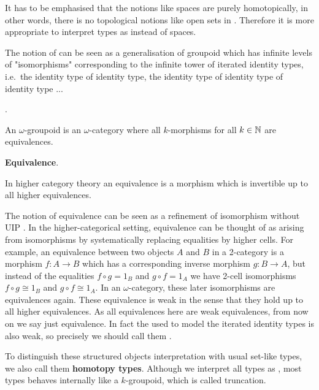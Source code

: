 \begin{remark}
It has to be emphasised that the notions like spaces are purely homotopically, in other words, there is no topological notions like open sets in \hott. Therefore it is more appropriate to interpret types as \og instead of spaces. 

The notion of \og can be seen as a generalisation of groupoid which has infinite levels of "isomorphisms" corresponding to the infinite tower of iterated identity types, i.e.\ the identity type of identity type, the identity type of identity type of identity type ... 


\begin{definition}
\textbf{\ogs}.

An $\omega$-groupoid is an $\omega$-category where all $k$-morphisms for all $k \in \mathbb{N}$ are equivalences. 
\end{definition}

\begin{definition}
\textbf{Equivalence}.

In higher category theory an equivalence is a morphism which is invertible up to all higher equivalences.
\end{definition}


The notion of equivalence can be seen as a refinement of isomorphism without UIP \cite{txa:csl}. 
In the higher-categorical setting, equivalence can be thought of as arising from isomorphisms by systematically replacing equalities by higher cells.
For example, an equivalence 
between two objects $A$ and $B$ in a 2-category is a morphism $f : A \rightarrow B$ which has a
corresponding inverse morphism $ g : B \rightarrow A$, but instead of the
equalities $f ∘ g = 1_B$ and $g ∘ f = 1_A$ we have 2-cell isomorphisms $f ∘ g ≅ 1_B$ and $g ∘ f ≅ 1_A$. In an $\omega$-category, these later isomorphisms are equivalences again.
These equivalence is weak in the sense that they hold up to all higher equivalences. 
As all equivalences here are weak equivalences, from now on we say just equivalence.
In fact the \og used to model the iterated identity types is also weak, so precisely we should call them \wog.

\end{remark}



To distinguish these structured objects interpretation with usual set-like types, we also call them \textbf{homotopy types}. Although we interpret all types as \og, most types behaves internally like a $k$-groupoid, which is called truncation.

